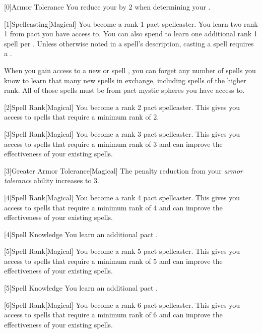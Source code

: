         [0]{Armor Tolerance} You reduce your  by 2 when determining your .

        [1]{Spellcasting}[Magical]
        You become a rank 1 pact spellcaster.
        You learn two rank 1  from pact  you have access to.
        You can also spend  to learn one additional rank 1 spell per .
        Unless otherwise noted in a spell's description, casting a spell requires a .

        When you gain access to a new  or spell ,
            you can forget any number of spells you know to learn that many new spells in exchange,
            including spells of the higher rank.
        All of those spells must be from pact mystic spheres you have access to.

        [2]{Spell Rank}[Magical] You become a rank 2 pact spellcaster.
        This gives you access to spells that require a minimum rank of 2.

        [3]{Spell Rank}[Magical] You become a rank 3 pact spellcaster.
        This gives you access to spells that require a minimum rank of 3 and can improve the effectiveness of your existing spells.

        [3]{Greater Armor Tolerance}[Magical] The penalty reduction from your \textit{armor tolerance} ability increases to 3.

        [4]{Spell Rank}[Magical] You become a rank 4 pact spellcaster.
        This gives you access to spells that require a minimum rank of 4 and can improve the effectiveness of your existing spells.

        [4]{Spell Knowledge} You learn an additional pact .

        [5]{Spell Rank}[Magical] You become a rank 5 pact spellcaster.
        This gives you access to spells that require a minimum rank of 5 and can improve the effectiveness of your existing spells.

        [5]{Spell Knowledge} You learn an additional pact .

        [6]{Spell Rank}[Magical] You become a rank 6 pact spellcaster.
        This gives you access to spells that require a minimum rank of 6 and can improve the effectiveness of your existing spells.

